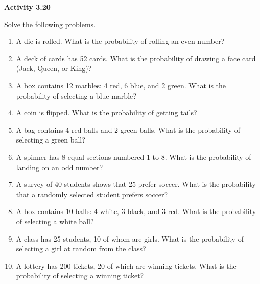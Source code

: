 \vspace{0.3ex}
\noindent\textbf{Activity 3.20}

\vspace{0.2ex}

Solve the following problems.

\begin{enumerate}[label=\color{blue}\arabic*.]
    \item A die is rolled. What is the probability of rolling an even number?
    \item A deck of cards has 52 cards. What is the probability of drawing a face card (Jack, Queen, or King)?
    \item A box contains 12 marbles: 4 red, 6 blue, and 2 green. What is the probability of selecting a blue marble?
    \item A coin is flipped. What is the probability of getting tails?
    \item A bag contains 4 red balls and 2 green balls. What is the probability of selecting a green ball?
    \item A spinner has 8 equal sections numbered 1 to 8. What is the probability of landing on an odd number?
    \item A survey of 40 students shows that 25 prefer soccer. What is the probability that a randomly selected student prefers soccer?
    \item A box contains 10 balls: 4 white, 3 black, and 3 red. What is the probability of selecting a white ball?
    \item A class has 25 students, 10 of whom are girls. What is the probability of selecting a girl at random from the class?
    \item A lottery has 200 tickets, 20 of which are winning tickets. What is the probability of selecting a winning ticket?
\end{enumerate}

